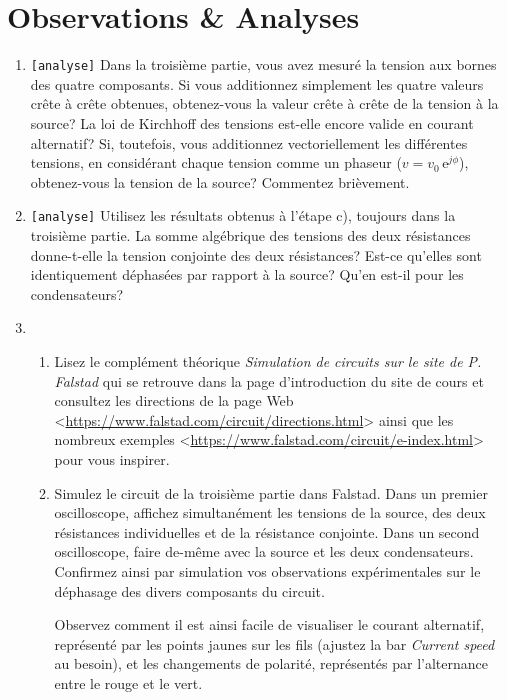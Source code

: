 \documentclass[canadien,12pt,oneside,letterpaper]{article}
\begin{document}
\section{Observations \& Analyses}

\begin{enumerate}
    \item \texttt{[analyse]} Dans la troisième partie, vous avez mesuré la tension aux bornes des quatre composants. Si vous additionnez simplement les quatre valeurs crête à crête obtenues, obtenez-vous la valeur crête à crête de la tension à la source? La loi de Kirchhoff des tensions est-elle encore valide en courant alternatif? Si, toutefois, vous additionnez vectoriellement les différentes tensions, en considérant chaque tension comme un phaseur ($v=v_0\,\textrm{e}^{j\phi}$), obtenez-vous la tension de la source? Commentez brièvement.
    \item \texttt{[analyse]} Utilisez les résultats obtenus à l'étape c), toujours dans la troisième partie. La somme algébrique des tensions des deux résistances donne-t-elle la tension conjointe des deux résistances? Est-ce qu'elles sont identiquement déphasées par rapport à la source? Qu'en est-il pour les condensateurs?
    \item 
    \begin{enumerate}
        \item Lisez le complément théorique \textit{Simulation de circuits sur le site de P. Falstad} qui se retrouve dans la page d'introduction du site de cours et consultez les directions de la page Web <\url{https://www.falstad.com/circuit/directions.html}> ainsi que les nombreux exemples <\url{https://www.falstad.com/circuit/e-index.html}> pour vous inspirer.\par
        \item Simulez le circuit de la troisième partie dans Falstad. Dans un premier oscilloscope, affichez simultanément les tensions de la source, des deux résistances individuelles et de la résistance conjointe. Dans un second oscilloscope, faire de-même avec la source et les deux condensateurs. Confirmez ainsi par simulation vos observations expérimentales sur le déphasage des divers composants du circuit.\par
        Observez comment il est ainsi facile de visualiser le courant alternatif, représenté par les points jaunes sur les fils (ajustez la bar \textit{Current speed} au besoin), et les changements de polarité, représentés par l'alternance entre le rouge et le vert.\par  

\end{enumerate}
\end{enumerate}
\end{document}
